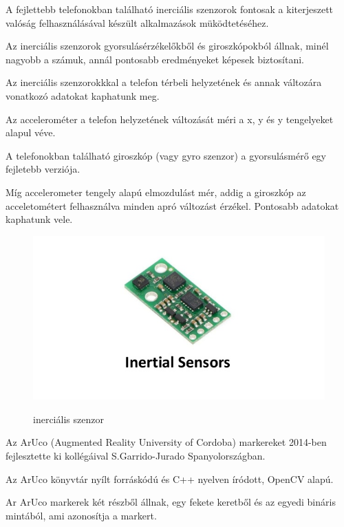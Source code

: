 
A fejlettebb telefonokban található inerciális szenzorok fontosak a kiterjeszett valóság felhasználásával készült alkalmazások müködtetéséhez.  

Az inerciális szenzorok gyorsulásérzékelőkből és giroszkópokból állnak, minél nagyobb a számuk, annál pontosabb eredményeket képesek biztosítani.

Az inerciális szenzorokkkal a telefon térbeli helyzetének és annak változára vonatkozó adatokat kaphatunk meg.

Az accelerométer a telefon helyzetének változását méri a x, y és y tengelyeket alapul véve. 

A telefonokban található giroszkóp (vagy gyro szenzor) a gyorsulásmérő egy fejletebb verziója.

Míg accelerometer tengely alapú elmozdulást mér, addig a giroszkóp az acceletométert felhasználva minden apró változást érzékel. Pontosabb adatokat kaphatunk vele.
\cite{inercialis}
\begin{figure}[htp]
    \centering
   	\includegraphics[width=3truecm, height=2truecm]{images/inertial.jpg}
	\caption{inerciális szenzor}
	\cite{iner_kep}
\end{figure}



Az ArUco (Augmented Reality University of Cordoba) markereket 2014-ben fejlesztette ki kollégáival S.Garrido-Jurado Spanyolországban. 

Az ArUco könyvtár nyílt forráskódú és C++ nyelven íródott, OpenCV alapú. 

Ar ArUco markerek két részből állnak, egy fekete keretből és az egyedi bináris mintából, ami azonosítja a markert. 

